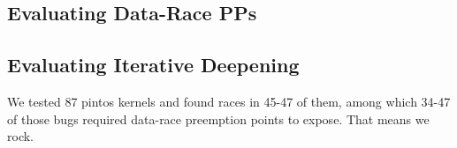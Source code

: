 \subsection{Evaluating Data-Race PPs}

\subsection{Evaluating Iterative Deepening}



We tested 87 pintos kernels and found races in 45-47 of them, among which 34-47 of those bugs required data-race preemption points to expose. That means we rock.

